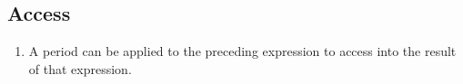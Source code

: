 \subsection{Access}

\begin{enumerate}
\item A period can be applied to the preceding expression to access into the result of that expression.
\end{enumerate}